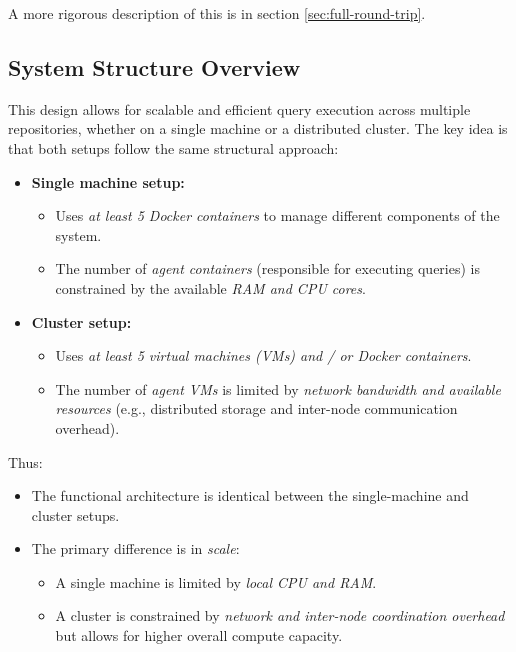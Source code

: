\documentclass[11pt]{article}
\begin{document}
A more rigorous description of this is in section \ref{sec:full-round-trip}.

\subsection{System Structure Overview}

This design allows for scalable and efficient query execution across multiple
repositories, whether on a single machine or a distributed cluster. The key idea
is that both setups follow the same structural approach:

\begin{itemize}
\item \textbf{Single machine setup:}
  \begin{itemize}
  \item Uses \textit{at least 5 Docker containers} to manage different
    components of the system.
  \item The number of \textit{agent containers} (responsible for executing
    queries) is constrained by the available \textit{RAM and CPU cores}.
  \end{itemize}
  
\item \textbf{Cluster setup:}
  \begin{itemize}
  \item Uses \textit{at least 5 virtual machines (VMs) and / or Docker containers}.
  \item The number of \textit{agent VMs} is limited by \textit{network bandwidth
      and available resources} (e.g., distributed storage and inter-node communication
    overhead).
  \end{itemize}
\end{itemize}

Thus:
\begin{itemize}
    \item The {functional architecture is identical} between the single-machine and cluster setups.
    \item The {primary difference} is in \textit{scale}:
    \begin{itemize}
        \item A single machine is limited by \textit{local CPU and RAM}.
        \item A cluster is constrained by \textit{network and inter-node coordination overhead} but allows for higher overall compute capacity.
    \end{itemize}
\end{itemize}
\end{document}
